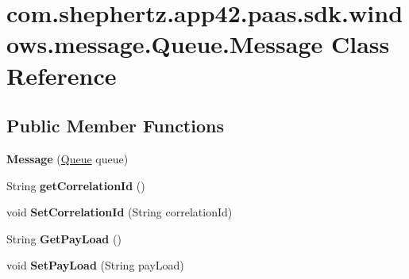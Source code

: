 \hypertarget{classcom_1_1shephertz_1_1app42_1_1paas_1_1sdk_1_1windows_1_1message_1_1_queue_1_1_message}{\section{com.\+shephertz.\+app42.\+paas.\+sdk.\+windows.\+message.\+Queue.\+Message Class Reference}
\label{classcom_1_1shephertz_1_1app42_1_1paas_1_1sdk_1_1windows_1_1message_1_1_queue_1_1_message}
}
\subsection*{Public Member Functions}
\begin{DoxyCompactItemize}
\item 
\hypertarget{classcom_1_1shephertz_1_1app42_1_1paas_1_1sdk_1_1windows_1_1message_1_1_queue_1_1_message_ad7a643776ac28c9ff11136d8f471aaf4}{{\bfseries Message} (\hyperlink{classcom_1_1shephertz_1_1app42_1_1paas_1_1sdk_1_1windows_1_1message_1_1_queue}{Queue} queue)}\label{classcom_1_1shephertz_1_1app42_1_1paas_1_1sdk_1_1windows_1_1message_1_1_queue_1_1_message_ad7a643776ac28c9ff11136d8f471aaf4}

\item 
\hypertarget{classcom_1_1shephertz_1_1app42_1_1paas_1_1sdk_1_1windows_1_1message_1_1_queue_1_1_message_a88be60840b70ed147d1b8f9ea4240fff}{String {\bfseries get\+Correlation\+Id} ()}\label{classcom_1_1shephertz_1_1app42_1_1paas_1_1sdk_1_1windows_1_1message_1_1_queue_1_1_message_a88be60840b70ed147d1b8f9ea4240fff}

\item 
\hypertarget{classcom_1_1shephertz_1_1app42_1_1paas_1_1sdk_1_1windows_1_1message_1_1_queue_1_1_message_a611f9145a4950f99fd43af6b3a734a6d}{void {\bfseries Set\+Correlation\+Id} (String correlation\+Id)}\label{classcom_1_1shephertz_1_1app42_1_1paas_1_1sdk_1_1windows_1_1message_1_1_queue_1_1_message_a611f9145a4950f99fd43af6b3a734a6d}

\item 
\hypertarget{classcom_1_1shephertz_1_1app42_1_1paas_1_1sdk_1_1windows_1_1message_1_1_queue_1_1_message_a86159b614b43747835fcd88160999825}{String {\bfseries Get\+Pay\+Load} ()}\label{classcom_1_1shephertz_1_1app42_1_1paas_1_1sdk_1_1windows_1_1message_1_1_queue_1_1_message_a86159b614b43747835fcd88160999825}

\item 
\hypertarget{classcom_1_1shephertz_1_1app42_1_1paas_1_1sdk_1_1windows_1_1message_1_1_queue_1_1_message_a31577dd1f971c5fa55a1669f21ae7edd}{void {\bfseries Set\+Pay\+Load} (String pay\+Load)}\label{classcom_1_1shephertz_1_1app42_1_1paas_1_1sdk_1_1windows_1_1message_1_1_queue_1_1_message_a31577dd1f971c5fa55a1669f21ae7edd}


\end{DoxyCompactItemize}

